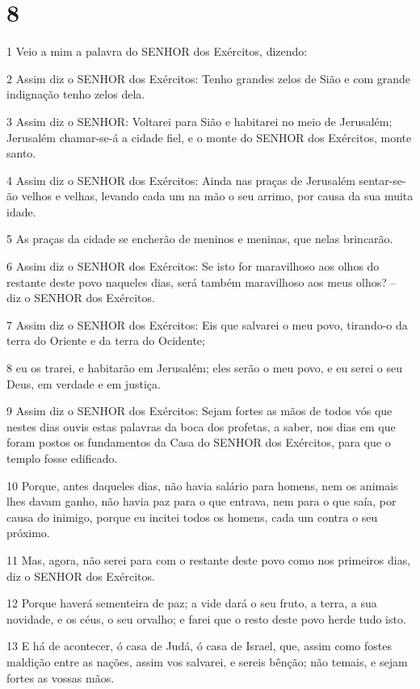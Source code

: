 \chapter{8}

\par 1 Veio a mim a palavra do SENHOR dos Exércitos, dizendo:
\par 2 Assim diz o SENHOR dos Exércitos: Tenho grandes zelos de Sião e com grande indignação tenho zelos dela.
\par 3 Assim diz o SENHOR: Voltarei para Sião e habitarei no meio de Jerusalém; Jerusalém chamar-se-á a cidade fiel, e o monte do SENHOR dos Exércitos, monte santo.
\par 4 Assim diz o SENHOR dos Exércitos: Ainda nas praças de Jerusalém sentar-se-ão velhos e velhas, levando cada um na mão o seu arrimo, por causa da sua muita idade.
\par 5 As praças da cidade se encherão de meninos e meninas, que nelas brincarão.
\par 6 Assim diz o SENHOR dos Exércitos: Se isto for maravilhoso aos olhos do restante deste povo naqueles dias, será também maravilhoso aos meus olhos? -- diz o SENHOR dos Exércitos.
\par 7 Assim diz o SENHOR dos Exércitos: Eis que salvarei o meu povo, tirando-o da terra do Oriente e da terra do Ocidente;
\par 8 eu os trarei, e habitarão em Jerusalém; eles serão o meu povo, e eu serei o seu Deus, em verdade e em justiça.
\par 9 Assim diz o SENHOR dos Exércitos: Sejam fortes as mãos de todos vós que nestes dias ouvis estas palavras da boca dos profetas, a saber, nos dias em que foram postos os fundamentos da Casa do SENHOR dos Exércitos, para que o templo fosse edificado.
\par 10 Porque, antes daqueles dias, não havia salário para homens, nem os animais lhes davam ganho, não havia paz para o que entrava, nem para o que saía, por causa do inimigo, porque eu incitei todos os homens, cada um contra o seu próximo.
\par 11 Mas, agora, não serei para com o restante deste povo como nos primeiros dias, diz o SENHOR dos Exércitos.
\par 12 Porque haverá sementeira de paz; a vide dará o seu fruto, a terra, a sua novidade, e os céus, o seu orvalho; e farei que o resto deste povo herde tudo isto.
\par 13 E há de acontecer, ó casa de Judá, ó casa de Israel, que, assim como fostes maldição entre as nações, assim vos salvarei, e sereis bênção; não temais, e sejam fortes as vossas mãos.
